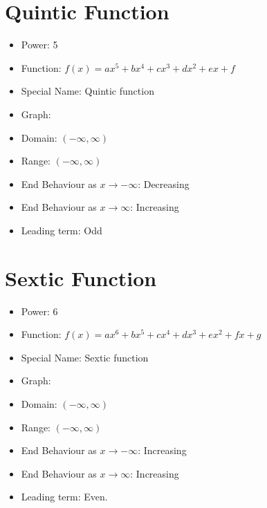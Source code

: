 \documentclass{article}
\begin{document}
\section*{Quintic Function}

\begin{itemize}
    \item Power: 5
    \item Function: $f(x) = ax^5 + bx^4 + cx^3 + dx^2 + ex + f$
    \item Special Name: Quintic function
    \item Graph:
    
    
    \item Domain: $(-\infty, \infty)$
    \item Range: $(-\infty, \infty)$
    \item End Behaviour as $x \rightarrow -\infty$: Decreasing
    \item End Behaviour as $x \rightarrow \infty$: Increasing
    \item Leading term: Odd
\end{itemize}
\newpage 

\section*{Sextic Function}

\begin{itemize}
    \item Power: 6
    \item Function: $f(x) = ax^6 + bx^5 + cx^4 + dx^3 + ex^2 + fx + g$
    \item Special Name: Sextic function
    \item Graph:
    
    
    \item Domain: $(-\infty, \infty)$
    \item Range: $(-\infty, \infty)$
    \item End Behaviour as $x \rightarrow -\infty$: Increasing
    \item End Behaviour as $x \rightarrow \infty$: Increasing
    \item Leading term: Even.
\end{itemize}
\newpage 
\end{document}
